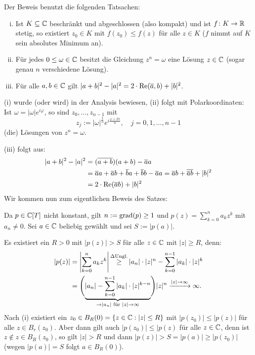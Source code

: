\begin{beweis}
	Der Beweis benutzt die folgenden Tatsachen:
	\begin{enumerate}[(i)]
		\item Ist $K \subseteq \mathbb{C}$ beschränkt und abgeschlossen (also kompakt) und ist $f \colon K \rightarrow \mathbb{R}$ stetig, so existiert $z_0 \in K$ mit $f(z_0) \leq f(z)$ für alle $z \in K$ ($f$ nimmt auf $K$ sein absolutes Minimum an).
		\item Für jedes $0 \leq \omega \in \mathbb{C}$ besitzt die Gleichung $z^n = \omega$ eine Lösung $z \in \mathbb{C}$ (sogar genau $n$ verschiedene Lösung).
		\item Für alle $a,b \in \mathbb{C}$ gilt $|a+b|^2 - |a|^2 = 2 \cdot \operatorname{Re}(\overline{a},b)+|b|^2$.
	\end{enumerate}
	(i) wurde (oder wird) in der Analysis bewiesen, (ii) folgt mit Polarkoordinaten:
	Ist $\omega = |\omega|e^{i\varphi}$, so sind $z_0,\dots,z_{n-1}$ mit
	\[
		z_j := |\omega|^{\frac{1}{n}} e^{i \frac{\varphi+2\pi}{n}}, \quad j=0,1,\dots,n-1
	\]
	(die) Lösungen von $z^n = \omega$.
	
	(iii) folgt aus:
	\begin{align*}
		|a+b|^2 - |a|^2 &= (\overline{a+b})(a+b) - \overline{a}a \\
		&= \overline{a}a + \overline{a}b + \overline{b}a + \overline{b}b - \overline{a}a = \overline{a}b + \overline{\overline{a}b} + |b|^2 \\
		&=2 \cdot \operatorname{Re}(\overline{a}b) + |b|^2
	\end{align*}
	Wir kommen nun zum eigentlichen Beweis des Satzes:
	
	Da $p \in \mathbb{C}[T]$ nicht konstant, gilt $n := \operatorname{grad}(p) \geq 1$ und $p(z) = \sum_{k=0}^{n} a_kz^k$ mit $a_n \neq 0$.
	Sei $a \in \mathbb{C}$ beliebig gewählt und sei $S:= |p(a)|$.
	
	Es existiert ein $R > 0$ mit $|p(z)|> S$ für alle $z \in \mathbb{C}$ mit $|z| \geq R$, denn:
	\begin{align*}
		|p(z)| &= \abs*{\sum_{k=0}^{n} a_k z^{k}} \stack{\Delta\text{Ungl.}}{\geq} |a_n| \cdot |z|^n - \sum_{k=0}^{n-1} |a_k| \cdot |z|^k \\
		&= \Bigg(\Underbrace{|a_n| - \sum_{k=0}^{n-1} |a_k| \cdot |z|^{k-n}}{\rightarrow |a_n| \text{ für } |z| \rightarrow \infty}\Bigg) |z|^n \xrightarrow{|z|\rightarrow \infty} \infty.
	\end{align*}
	Nach (i) existiert ein $z_0 \in B_R(0) = \{z \in \mathbb{C} : |z| \leq R\}$ mit $|p(z_0)| \leq |p(z)|$ für alle $z \in B_r(z_0)$.
	Aber dann gilt auch $|p(z_0)| \leq |p(z)$ für alle $z \in \mathbb{C}$, denn ist $z \notin z \in B_R(z_0)$, so gilt $|z|>R$ und dann $|p(z)| > S = |p(a)| \geq |p(z_0)|$ (wegen $|p(a)| = S$ folgt $a \in B_R(0)$).
	

\end{beweis}
